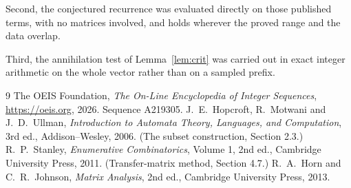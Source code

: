 \documentclass[11pt,a4paper]{article}
\theoremstyle{plain}
\theoremstyle{definition}
\begin{document}
Second, the conjectured recurrence was evaluated directly on those published terms, with no
matrices involved, and holds wherever the proved range and the data overlap.

Third, the annihilation test of Lemma~\ref{lem:crit} was carried out in exact integer
arithmetic on the whole vector rather than on a sampled prefix.

\begin{thebibliography}{9}
 The OEIS Foundation, \emph{The On-Line Encyclopedia of Integer
Sequences}, \url{https://oeis.org}, 2026. Sequence A219305.
 J.~E.~Hopcroft, R.~Motwani and J.~D.~Ullman, \emph{Introduction to Automata
Theory, Languages, and Computation}, 3rd ed., Addison--Wesley, 2006. (The subset
construction, Section 2.3.)
 R.~P.~Stanley, \emph{Enumerative Combinatorics}, Volume 1, 2nd ed.,
Cambridge University Press, 2011. (Transfer-matrix method, Section 4.7.)
 R.~A.~Horn and C.~R.~Johnson, \emph{Matrix Analysis}, 2nd ed., Cambridge
University Press, 2013.
\end{thebibliography}
\end{document}
